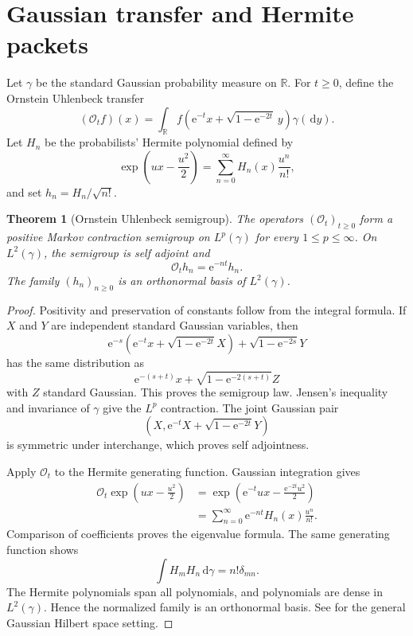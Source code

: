 \documentclass[11pt,letterpaper]{article}
\newtheorem{theorem}{Theorem}[section]
\theoremstyle{plain}
\theoremstyle{plain}
\theoremstyle{plain}
\theoremstyle{definition}
\theoremstyle{definition}
\theoremstyle{definition}
\theoremstyle{definition}
\theoremstyle{definition}
\theoremstyle{remark}
\theoremstyle{remark}
\theoremstyle{remark}
\theoremstyle{remark}
\theoremstyle{remark}
\theoremstyle{remark}
\newcommand{\RR}{\mathbb R}
\newcommand{\Ocal}{\mathcal O}
\newcommand{\e}{\mathrm e}
\newcommand{\dd}{\,\mathrm d}
\let\KomorebiPrimitiveMathcal\mathcal
\renewcommand{\mathcal}[1]{{\KomorebiPrimitiveMathcal{#1}}}
\let\KomorebiPrimitivemathbb\mathbb
\renewcommand{\mathbb}[1]{{\KomorebiPrimitivemathbb{#1}}}
\let\KomorebiPrimitivemathrm\mathrm
\renewcommand{\mathrm}[1]{{\KomorebiPrimitivemathrm{#1}}}
\begin{document}
\FloatBarrier
\section{Gaussian transfer and Hermite packets}\label{extended:section:07}\label{extended:sec:ou_hermite}

Let \(\gamma\) be the standard Gaussian probability measure on \(\RR\). For \(t\geq0\), define the Ornstein Uhlenbeck transfer
\[
(\Ocal_t f)(x)
=
\int_\RR
f\left(
\e^{-t}x+\sqrt{1-\e^{-2t}}\,y
\right)
\gamma(\dd y).
\]
Let \(H_n\) be the probabilists' Hermite polynomial defined by
\[
\exp\left(ux-\frac{u^2}{2}\right)
=
\sum_{n=0}^\infty H_n(x)\frac{u^n}{n!},
\]
and set \(h_n=H_n/\sqrt{n!}\).

\begin{theorem}[Ornstein Uhlenbeck semigroup]\label{extended:record:040}\label{extended:thm:ou_semigroup}
The operators \((\Ocal_t)_{t\geq0}\) form a positive Markov contraction semigroup on \(L^p(\gamma)\) for every \(1\leq p\leq\infty\). On \(L^2(\gamma)\), the semigroup is self adjoint and
\[
\Ocal_t h_n=\e^{-nt}h_n.
\]
The family \((h_n)_{n\geq0}\) is an orthonormal basis of \(L^2(\gamma)\).
\end{theorem}

\begin{proof}
Positivity and preservation of constants follow from the integral formula. If \(X\) and \(Y\) are independent standard Gaussian variables, then
\[
\e^{-s}
\left(
\e^{-t}x+\sqrt{1-\e^{-2t}}X
\right)
+
\sqrt{1-\e^{-2s}}Y
\]
has the same distribution as
\[
\e^{-(s+t)}x
+
\sqrt{1-\e^{-2(s+t)}}Z
\]
with \(Z\) standard Gaussian. This proves the semigroup law. Jensen's inequality and invariance of \(\gamma\) give the \(L^p\) contraction. The joint Gaussian pair
\[
\left(
X,
\e^{-t}X+\sqrt{1-\e^{-2t}}Y
\right)
\]
is symmetric under interchange, which proves self adjointness.

Apply \(\Ocal_t\) to the Hermite generating function. Gaussian integration gives
\[
\begin{aligned}
\Ocal_t
\exp\left(ux-\frac{u^2}{2}\right)
&=
\exp\left(
\e^{-t}ux-
\frac{\e^{-2t}u^2}{2}
\right)\\
&=
\sum_{n=0}^\infty
\e^{-nt}H_n(x)\frac{u^n}{n!}.
\end{aligned}
\]
Comparison of coefficients proves the eigenvalue formula. The same generating function shows
\[
\int H_mH_n\dd\gamma=n!\delta_{mn}.
\]
The Hermite polynomials span all polynomials, and polynomials are dense in \(L^2(\gamma)\). Hence the normalized family is an orthonormal basis. See \cite{Janson1997} for the general Gaussian Hilbert space setting.
\end{proof}
\end{document}
